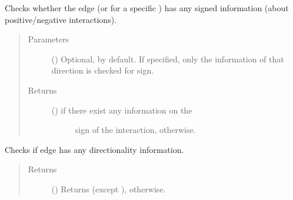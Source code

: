 \documentclass[letterpaper,10pt,english]{sphinxmanual}
\begin{document}
\begin{fulllineitems}
\begin{fulllineitems}
\begin{quote}
\begin{description}
\end{description}\end{quote}

\end{fulllineitems}


\begin{fulllineitems}
\label{\detokenize{main:pypath.main.Direction.has_sign}}
Checks whether the edge (or for a specific ) has
any signed information (about positive/negative interactions).
\begin{quote}\begin{description}
\item[{Parameters}] \leavevmode
{} () \textendash{} Optional,  by default. If specified, only the
information of that direction is checked for sign.

\item[{Returns}] \leavevmode
\begin{description}
\item[{() \textendash{}  if there exist any information on the}] \leavevmode
sign of the interaction,  otherwise.

\end{description}


\end{description}\end{quote}

\end{fulllineitems}


\begin{fulllineitems}
\label{\detokenize{main:pypath.main.Direction.is_directed}}
Checks if edge has any directionality information.
\begin{quote}\begin{description}
\item[{Returns}] \leavevmode
() \textendash{} Returns  (except ),
 otherwise.


\end{description}
\end{quote}
\end{fulllineitems}
\end{fulllineitems}
\end{document}
